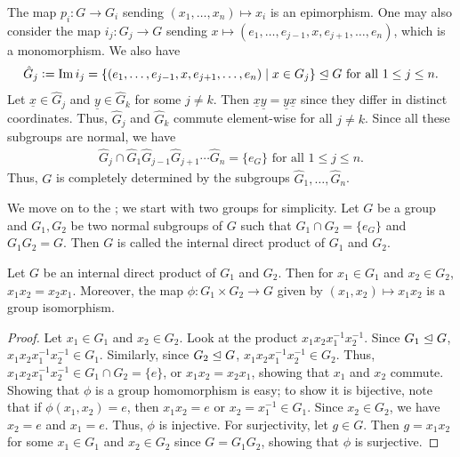 The map $p_{i}:G \to G_{i}$ sending $(x_{1},\ldots,x_{n}) \mapsto x_{i}$ is an epimorphism. One may also consider the map $i_{j}:G_{j} \to G$ sending $x \mapsto (e_{1},\ldots,e_{j-1},x,e_{j+1},\ldots,e_{n})$, which is a monomorphism. We also have
\begin{align}
    \hat{G}_{j} \vcentcolon= \operatorname{Im} i_{j} = \{(e_{1},\ldots,e_{j-1},x,e_{j+1},\ldots,e_{n}) \mid x \in G_{j}\} \trianglelefteq G \text{ for all } 1 \leq j \leq n.
\end{align}
Let $\underline{x} \in \hat{G}_{j}$ and $\underline{y} \in \hat{G}_{k}$ for some $j \neq k$. Then $\underline{x}\underline{y} = \underline{y}\underline{x}$ since they differ in distinct coordinates. Thus, $\hat{G}_{j}$ and $\hat{G}_{k}$ commute element-wise for all $j \neq k$. Since all these subgroups are normal, we have
\begin{align}
    \hat{G}_{j} \cap \hat{G}_{1} \hat{G}_{j-1} \hat{G}_{j+1} \cdots \hat{G}_{n} = \{e_{G}\} \text{ for all } 1 \leq j \leq n.
\end{align}
Thus, $G$ is completely determined by the subgroups $\hat{G}_{1},\ldots,\hat{G}_{n}$.

We move on to the ; we start with two groups for simplicity. Let $G$ be a group and $G_{1},G_{2}$ be two normal subgroups of $G$ such that $G_{1} \cap G_{2} = \{e_{G}\}$ and $G_{1}G_{2} = G$. Then $G$ is called the internal direct product of $G_{1}$ and $G_{2}$.

\begin{proposition}
    Let $G$ be an internal direct product of $G_{1}$ and $G_{2}$. Then for $x_{1} \in G_{1}$ and $x_{2} \in G_{2}$, $x_{1}x_{2} = x_{2}x_{1}$. Moreover, the map $\phi:G_{1} \times G_{2} \to G$ given by $(x_{1},x_{2}) \mapsto x_{1}x_{2}$ is a group isomorphism.
\end{proposition}
\begin{proof}
    Let $x_{1} \in G_{1}$ and $x_{2} \in G_{2}$. Look at the product $x_{1}x_{2}x_{1}^{-1}x_{2}^{-1}$. Since $G_{1} \trianglelefteq G$, $x_{1}x_{2}x_{1}^{-1}x_{2}^{-1} \in G_{1}$. Similarly, since $G_{2} \trianglelefteq G$, $x_{1}x_{2}x_{1}^{-1}x_{2}^{-1} \in G_{2}$. Thus, $x_{1}x_{2}x_{1}^{-1}x_{2}^{-1} \in G_{1} \cap G_{2} = \{e\}$, or $x_{1}x_{2} = x_{2}x_{1}$, showing that $x_{1}$ and $x_{2}$ commute. Showing that $\phi$ is a group homomorphism is easy; to show it is bijective, note that if $\phi(x_{1},x_{2}) = e$, then $x_{1}x_{2} = e$ or $x_{2} = x_{1}^{-1} \in G_{1}$. Since $x_{2} \in G_{2}$, we have $x_{2} = e$ and $x_{1} = e$. Thus, $\phi$ is injective. For surjectivity, let $g \in G$. Then $g = x_{1}x_{2}$ for some $x_{1} \in G_{1}$ and $x_{2} \in G_{2}$ since $G = G_{1}G_{2}$, showing that $\phi$ is surjective.
\end{proof}

